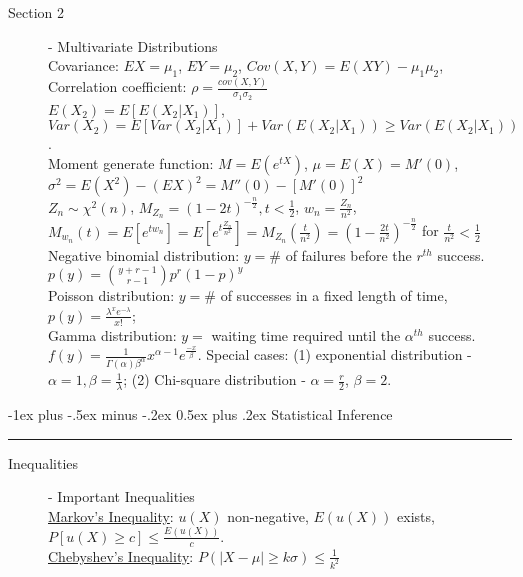 \documentclass[10pt,landscape]{article}
\makeatletter
\renewcommand{\section}{\@startsection{section}{1}{0mm}%
                                {-1ex plus -.5ex minus -.2ex}%
                                {0.5ex plus .2ex}%
                                {\normalfont\normalsize\bfseries}}
\renewcommand{\subsection}{\@startsection{subsection}{2}{0mm}%
                                {-1explus -.5ex minus -.2ex}%
                                {0.5ex plus .2ex}%
                                {\normalfont\normalsize\bfseries}}
\makeatother
\begin{document}
\begin{multicols}{3}
    \begin{description}
    		\item[Section 2] - Multivariate Distributions\\ %
    		Covariance: $EX = \mu_1$, $EY = \mu_2$, $Cov(X, Y) = E(XY) - \mu_1\mu_2$, \\
    		Correlation coefficient: $\rho = \frac{cov(X, Y)}{\sigma_1\sigma_2}$ \\
    		$E(X_2) = E[E(X_2|X_1)]$, $Var(X_2) = E[Var(X_2|X_1)] + Var(E(X_2|X_1)) \geq Var(E(X_2|X_1))$.\\
		Moment generate function: 	$M = E(e^{tX})$, $\mu = E(X) = M'(0)$, $\sigma^2 = E(X^2) - (EX)^2 = M''(0) - [M'(0)]^2$\\
		$Z_n \sim \chi^2(n)$, $M_{Z_n} = (1 - 2t)^{-\frac{n}{2}}, t< \frac{1}{2}$, $w_n = \frac{Z_n}{n^2}$, $M_{w_n}(t) = E[e^{tw_n}] = E[e^{t\frac{Z_n}{n^2}}] = M_{Z_n}(\frac{t}{n^2}) = (1-\frac{2t}{n^2})^{-\frac{n}{2}}$ for $\frac{t}{n^2} < \frac{1}{2}$\\
		Negative binomial distribution: $y = \#$ of failures before the $r^{th}$ success. $p(y) = {{y+r-1}\choose{r-1}}p^r(1-p)^y$ \\
		Poisson distribution: $y = \#$ of successes in a fixed length of time, $p(y) = \frac{\lambda^x e^{-\lambda}}{x!}$;\\
		Gamma distribution: $y =$ waiting time required until the $\alpha^{th}$ success. $f(y) = \frac{1}{\Gamma(\alpha) \beta^\alpha} x^{\alpha - 1} e^{\frac{-x}{\beta}}$. Special cases: (1) exponential distribution - $\alpha = 1, \beta	= \frac{1}{\lambda}$; (2) Chi-square distribution - $\alpha = \frac{r}{2}$, $\beta = 2$.\\
				
\end{description}

\section{Statistical Inference}\smallskip \hrule height 1pt \smallskip


\begin{description}
\item[Inequalities] - Important Inequalities \\
	\underline{Markov's Inequality}: $u(X)$ non-negative, $E(u(X))$ exists, $P[u(X)\geq c] \leq \frac{E(u(X))}{c}$.\\ 
	\underline{Chebyshev's Inequality}: $P(|X - \mu| \geq k\sigma) \leq \frac{1}{k^2}$
\end{description}


\end{multicols}
\end{document}

